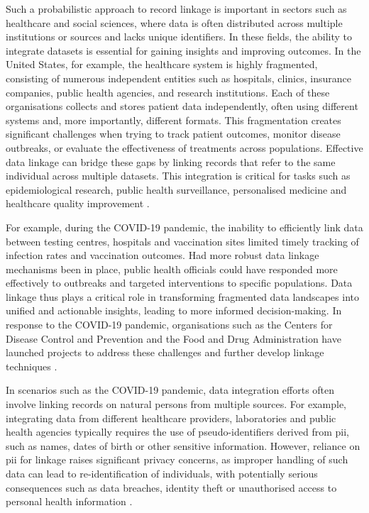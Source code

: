 Such a probabilistic approach to record linkage is important in sectors such as healthcare and social sciences, where data is often distributed across multiple institutions or sources and lacks unique identifiers.
In these fields, the ability to integrate datasets is essential for gaining insights and improving outcomes.
In the United States, for example, the healthcare system is highly fragmented, consisting of numerous independent entities such as hospitals, clinics, insurance companies, public health agencies, and research institutions.
Each of these organisations collects and stores patient data independently, often using different systems and, more importantly, different formats.
This fragmentation creates significant challenges when trying to track patient outcomes, monitor disease outbreaks, or evaluate the effectiveness of treatments across populations.
Effective data linkage can bridge these gaps by linking records that refer to the same individual across multiple datasets.
This integration is critical for tasks such as epidemiological research, public health surveillance, personalised medicine and healthcare quality improvement \cite{pathak2024privacy, vatsalan2017privacy}.

For example, during the COVID-19 pandemic, the inability to efficiently link data between testing centres, hospitals and vaccination sites limited timely tracking of infection rates and vaccination outcomes.
Had more robust data linkage mechanisms been in place, public health officials could have responded more effectively to outbreaks and targeted interventions to specific populations.
Data linkage thus plays a critical role in transforming fragmented data landscapes into unified and actionable insights, leading to more informed decision-making.
In response to the COVID-19 pandemic, organisations such as the Centers for Disease Control and Prevention and the Food and Drug Administration have launched projects to address these challenges and further develop linkage techniques \cite{pathak2024privacy}.

In scenarios such as the COVID-19 pandemic, data integration efforts often involve linking records on natural persons from multiple sources.
For example, integrating data from different healthcare providers, laboratories and public health agencies typically requires the use of pseudo-identifiers derived from \ac{pii}, such as names, dates of birth or other sensitive information.
However, reliance on \ac{pii} for linkage raises significant privacy concerns, as improper handling of such data can lead to re-identification of individuals, with potentially serious consequences such as data breaches, identity theft or unauthorised access to personal health information \cite{pathak2024privacy, schnell2009privacy}.

